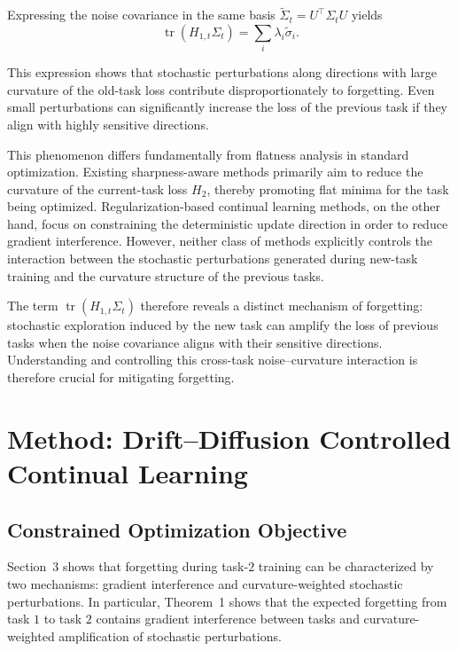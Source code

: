 \documentclass{article}
\begin{document}
Expressing the noise covariance in the same basis $\tilde{\Sigma}_t = U^\top \Sigma_t U$ yields
\begin{equation}
\operatorname{tr}(H_{1,t}\Sigma_t)
=
\sum_i
\lambda_i \tilde{\sigma}_i .
\end{equation}

This expression shows that stochastic perturbations along directions with large curvature of the old-task loss contribute disproportionately to forgetting.
Even small perturbations can significantly increase the loss of the previous task if they align with highly sensitive directions.

This phenomenon differs fundamentally from flatness analysis in standard optimization.
Existing sharpness-aware methods primarily aim to reduce the curvature of the current-task loss $H_{2}$, thereby promoting flat minima for the task being optimized.
Regularization-based continual learning methods, on the other hand, focus on constraining the deterministic update direction in order to reduce gradient interference.
However, neither class of methods explicitly controls the interaction between the stochastic perturbations generated during new-task training and the curvature structure of the previous tasks.

The term $\operatorname{tr}(H_{1,t}\Sigma_t)$ therefore reveals a distinct mechanism of forgetting: stochastic exploration induced by the new task can amplify the loss of previous tasks when the noise covariance aligns with their sensitive directions.
Understanding and controlling this cross-task noise--curvature interaction is therefore crucial for mitigating forgetting.


\section{Method: Drift–Diffusion Controlled Continual Learning}
\subsection{Constrained Optimization Objective}

Section~3 shows that forgetting during task-$2$ training can be characterized by two mechanisms: gradient interference and curvature-weighted stochastic perturbations. 
In particular, Theorem~1 shows that the expected forgetting from task $1$ to task $2$ contains gradient interference between tasks and  curvature-weighted amplification of stochastic perturbations.
\end{document}
